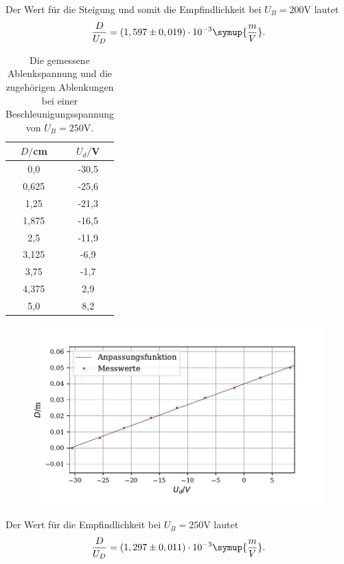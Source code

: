 Der Wert für die Steigung und somit die Empfindlichkeit bei $U_B = 200 \si{\volt}$ lautet
\begin{align*}
\frac{D}{U_D} = (1,597 \pm 0,019) \cdot 10^{-3} \symup{\frac{m}{V}} .
\end{align*}



\begin{table}[H]
  \centering
  \caption{Die gemessene Ablenkspannung und die zugehörigen Ablenkungen bei einer Beschleunigungsspannung von $U_B = 250 \si{\volt}$.}
  \label{tab:Parameter}
  \begin{tabular}{c c}
    \toprule
    $D/$cm& $U_d/$V \\
    \bottomrule
    0,0 & -30,5 \\
     0,625 & -25,6  \\
     1,25 & -21,3 \\
     1,875 & -16,5  \\
     2,5 & -11,9 \\
     3,125 & -6,9  \\
     3,75& -1,7 \\
     4,375 & 2,9  \\
     5,0 &  8,2 \\
     \bottomrule
  \end{tabular}
\end{table}

\begin{figure}[H]
  \centering
  \includegraphics{plot4.pdf}
  \caption{}
  \label{fig:plot}
\end{figure}

Der Wert für die Empfindlichkeit bei $U_B = 250 \si{\volt}$ lautet
\begin{align*}
\frac{D}{U_D} = (1,297 \pm 0,011) \cdot 10^{-3} \symup{\frac{m}{V}} .
\end{align*}

